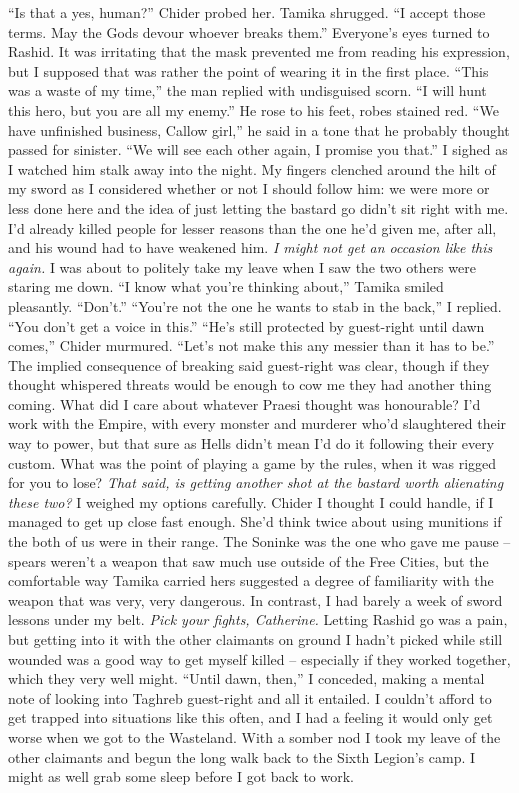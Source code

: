 \documentclass[12pt, openany]{book}
\begin{document}
“Is that a yes, human?” Chider probed her.
Tamika shrugged. “I accept those terms. May the Gods devour whoever breaks them.”
Everyone’s eyes turned to Rashid. It was irritating that the mask prevented me from reading his expression, but I supposed that was rather the point of wearing it in the first place.
“This was a waste of my time,” the man replied with undisguised scorn. “I will hunt this hero, but you are all my enemy.”
He rose to his feet, robes stained red.
“We have unfinished business, Callow girl,” he said in a tone that he probably thought passed for sinister. “We will see each other again, I promise you that.”
I sighed as I watched him stalk away into the night. My fingers clenched around the hilt of my sword as I considered whether or not I should follow him: we were more or less done here and the idea of just letting the bastard go didn’t sit right with me. I’d already killed people for lesser reasons than the one he’d given me, after all, and his wound had to have weakened him. \textit{I might not get an occasion like this again.} I was about to politely take my leave when I saw the two others were staring me down.
“I know what you’re thinking about,” Tamika smiled pleasantly. “Don’t.”
“You’re not the one he wants to stab in the back,” I replied. “You don’t get a voice in this.”
“He’s still protected by guest-right until dawn comes,” Chider murmured. “Let’s not make this any messier than it has to be.”
The implied consequence of breaking said guest-right was clear, though if they thought whispered threats would be enough to cow me they had another thing coming. What did I care about whatever Praesi thought was honourable? I’d work with the Empire, with every monster and murderer who’d slaughtered their way to power, but that sure as Hells didn’t mean I’d do it following their every custom. What was the point of playing a game by the rules, when it was rigged for you to lose? \textit{That said, is getting another shot at the bastard worth alienating these two?} I weighed my options carefully. Chider I thought I could handle, if I managed to get up close fast enough. She’d think twice about using munitions if the both of us were in their range. The Soninke was the one who gave me pause – spears weren’t a weapon that saw much use outside of the Free Cities, but the comfortable way Tamika carried hers suggested a degree of familiarity with the weapon that was very, very dangerous. In contrast, I had barely a week of sword lessons under my belt. \textit{Pick your fights, Catherine.} Letting Rashid go was a pain, but getting into it with the other claimants on ground I hadn’t picked while still wounded was a good way to get myself killed – especially if they worked together, which they very well might.
“Until dawn, then,” I conceded, making a mental note of looking into Taghreb guest-right and all it entailed.
I couldn’t afford to get trapped into situations like this often, and I had a feeling it would only get worse when we got to the Wasteland. With a somber nod I took my leave of the other claimants and begun the long walk back to the Sixth Legion’s camp. I might as well grab some sleep before I got back to work.
\end{document}
